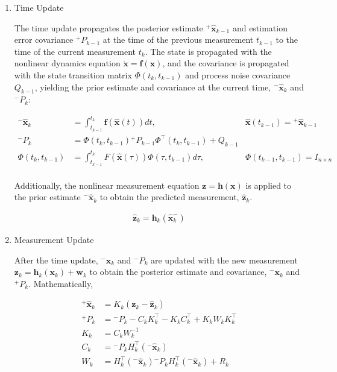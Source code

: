 \documentclass[letterpaper, preprint, paper,11pt]{AAS}	%
\begin{document}
\begin{enumerate}
    \item Time Update
    
    The time update propagates the posterior estimate ${}^+\hat{\bm{x}}_{k-1}$ and estimation error covariance ${}^+P_{k-1}$ at the time of the previous measurement $t_{k-1}$ to the time of the current measurement $t_k$. The state is propagated with the nonlinear dynamics equation $\dot{\bm{x}} = \bm{f}(\bm{x})$, and the covariance is propagated with the state transition matrix $\Phi(t_k, t_{k-1})$ and process noise covariance $Q_{k-1}$, yielding the prior estimate and covariance at the current time, ${}^-\bm{\hat{x}}_k$ and ${}^-P_k$:
    
    \begin{align}
        {}^-\hat{\bm{x}}_k &= \int_{t_{k-1}}^{t_k} \bm{f}(\bm{\hat{x}}(t)) dt, & \hat{\bm{x}}(t_{k-1}) = {}^+\hat{\bm{x}}_{k-1} \label{nonlinear estimate propagation (first EKF equation)} \\
        {}^-P_k &= \Phi(t_k, t_{k-1}) {}^+P_{k-1} \Phi^\top(t_k, t_{k-1}) + Q_{k-1}\\
        \Phi(t_k, t_{k-1}) &= \int_{t_{k-1}}^{t_k} F(\hat{\bm{x}}(\tau))\Phi(\tau, t_{k-1}) d\tau, & \Phi(t_{k-1}, t_{k-1}) = I_{n\times n}\\
    \end{align}
    
    Additionally, the nonlinear measurement equation $\bm{z} = \bm{h}(\bm{x})$ is applied to the prior estimate ${}^-\hat{\bm{x}}_k$ to obtain the predicted measurement, $\bm{\hat{z}}_k$.
    
    \begin{align}
        \bm{\hat{z}}_k = \bm{h}_k(\bm{\hat{x}}_k^-) \label{eq:predicted measurement}
    \end{align}

    \item Measurement Update
    
    After the time update, ${}^-\bm{\hat{x}}_k$ and ${}^-P_k$ are updated with the new measurement $\bm{z}_k = \bm{h}_k(\bm{x}_k) + \bm{w}_k$ to obtain the posterior estimate and covariance, ${}^-\bm{x}_k$ and ${}^+P_k$. Mathematically,

    \begin{align}
        ^+\bm{\hat{x}}_k &= K_k (\bm{z}_k - \bm{\hat{z}}_k)\\
        ^+P_k &= {}^-P_k - C_k K_k^\top - K_k C_k ^\top + K_k W_k K_k^\top \\
        K_k &= C_k W_k^{-1} \\
        C_k &= {}^-P_k H_k^\top({}^-\bm{\hat{x}}_k) \\
        W_k &= H_k^\top({}^-\bm{\hat{x}}_k) {}^-P_k H_k^\top({}^-\bm{\hat{x}}_k) + R_k \label{eq:innovations covariance (last EKF eq)}
    \end{align}
    

\end{enumerate}
\end{document}
